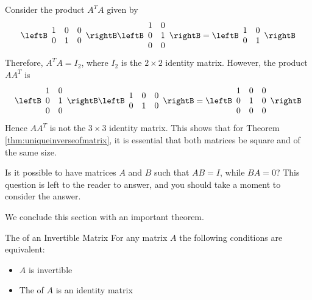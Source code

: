 \begin{solution}
Consider the product $A^{T}A$ given by 
\begin{equation*}
\leftB
\begin{array}{rrr}
1 & 0 & 0\\
0 & 1 & 0
\end{array}
\rightB
\leftB
\begin{array}{rr}
1 & 0 \\
0 & 1 \\
0 & 0 
\end{array}
\rightB
=
\leftB
\begin{array}{rr}
1 & 0 \\
0 & 1
\end{array}
\rightB
\end{equation*}
Therefore, $A^{T}A = I_2$, where $I_2$ is the $2 \times 2$ identity matrix.
However, the product $AA^{T}$ is 
\begin{equation*}
\leftB
\begin{array}{rr}
1 & 0 \\
0 & 1 \\
0 & 0 
\end{array}
\rightB
\leftB
\begin{array}{rrr}
1 & 0 & 0\\
0 & 1 & 0
\end{array}
\rightB
=
\leftB
\begin{array}{rrr}
1 & 0 & 0 \\
0 & 1 & 0 \\
0 & 0 & 0
\end{array}
\rightB
\end{equation*}
Hence $AA^{T}$ is not the $3 \times 3$ identity matrix. This shows that for Theorem \ref{thm:uniqueinverseofmatrix}, it is essential that both matrices be square and of the same size.
\end{solution}

Is it possible to have matrices $A$ and $B$ such that $AB=I$, while $BA=0$? This question is left to the reader to answer, and you should take a moment to consider the answer.

We conclude this section with an important theorem.

\begin{theorem}{The \RREF of an Invertible Matrix}\label{thm:invertiblerref}
For any matrix $A$ the following conditions are equivalent:
\begin{itemize}
\item $A$ is invertible
\item The \rref \;of $A$ is an identity matrix
\end{itemize}
\end{theorem}

